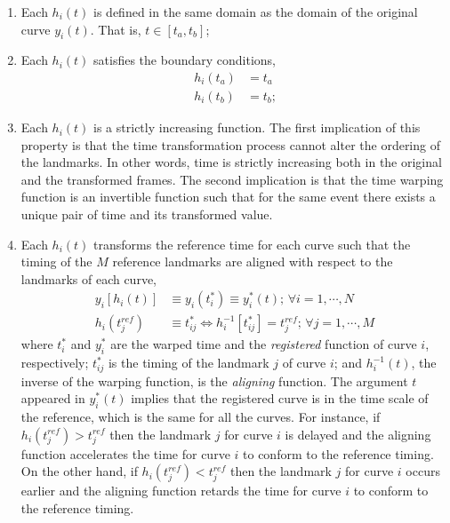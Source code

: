\begin{enumerate}
	
	\item Each $h_i(t)$ is defined in the same domain as the domain of the original curve $y_i(t)$. That is, $t \in [t_a, t_b]$;
  
	\item Each $h_i(t)$ satisfies the boundary conditions,
    \begin{equation}
      \begin{split}
        h_i(t_a) & = t_a \\
        h_i(t_b) & = t_b \text{;}
      \end{split}
    \label{eq:warping_boundaries}
    \end{equation}
   
	\item Each $h_i(t)$ is a strictly increasing function. The first implication of this property is that the time transformation process cannot alter the ordering of the landmarks.
         In other words, time is strictly increasing both in the original and the transformed frames.
         The second implication is that the time warping function is an invertible function 
         such that for the same event there exists a unique pair of time and its transformed value.
  
	\item Each $h_i(t)$ transforms the reference time for each curve such that the timing of the $M$ reference landmarks are aligned with respect to the landmarks of each curve,
          \begin{equation}
            \begin{split}
              y_i [h_i(t)]				& \equiv y_i(t^*_i) \equiv y^*_i(t) ; \, \forall i = 1, \cdots, N  \\
              h_i (t^{ref}_j) & \equiv t^*_{ij} \iff h_i^{-1}[t^*_{ij}] = t^{ref}_j  ; \, \forall j = 1, \cdots, M 
            \end{split}
          \label{eq:warping_transformation}
          \end{equation}
          where $t_i^*$ and $y_i^*$ are the warped time and the \emph{registered} function of curve $i$, respectively;
					$t_{ij}^*$ is the timing of the landmark $j$ of curve $i$;
					and $h^{-1}_i(t)$, the inverse of the warping function, is the \emph{aligning} function. 
					The argument $t$ appeared in $y_i^*(t)$ implies that the registered curve is in the time scale of the reference, which is the same for all the curves.
          For instance, if $h_i(t^{ref}_j) > t^{ref}_j$ then the landmark $j$ for curve $i$ is delayed 
          and the aligning function accelerates the time for curve $i$ to conform to the reference timing.
          On the other hand, if $h_i(t^{ref}_j) < t^{ref}_j$ then the landmark $j$ for curve $i$ occurs earlier
          and the aligning function retards the time for curve $i$ to conform to the reference timing.
\end{enumerate}

